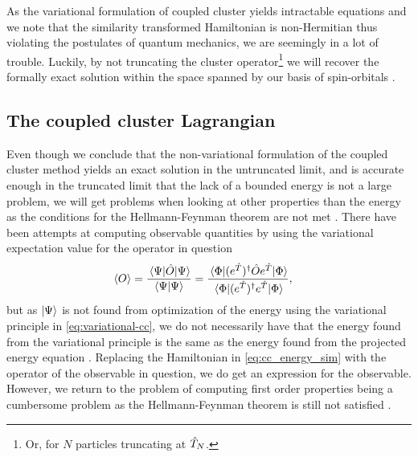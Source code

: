             As the variational formulation of coupled cluster yields intractable
            equations and we note that the similarity transformed Hamiltonian is
            non-Hermitian thus violating the postulates of quantum mechanics, we
            are seemingly in a lot of trouble.
            Luckily, by not truncating the cluster operator\footnote{%
                Or, for $N$ particles truncating at $\hat{T}_N$.
            } we will recover the formally exact solution within the space
            spanned by our basis of spin-orbitals \cite{coester1958421,
            monkhorst1977421}.

        \subsection{The coupled cluster Lagrangian}
            Even though we conclude that the non-variational formulation of
            the coupled cluster method yields an exact solution in the
            untruncated limit, and is accurate enough in the truncated limit
            that the lack of a bounded energy is not a large problem,
            we will get problems when looking at other properties than the
            energy as the conditions for the Hellmann-Feynman theorem are not
            met \cite{helgaker-molecular}.
            There have been attempts at computing observable quantities by using
            the variational expectation value for the operator in question
            \cite{exp-value-cizek, fink1974163}
            \begin{align}
                \expval{O}
                &= \frac{\mel{\Psi}{\hat{O}}{\Psi}}{\braket{\Psi}{\Psi}}
                = \frac{
                    \mel{\Phi}{
                        (e^{\hat{T}})^{\dagger}
                        \hat{O}
                        e^{\hat{T}}
                    }{\Phi}
                }{
                    \mel{\Phi}{
                        (e^{\hat{T}})^{\dagger}
                        e^{\hat{T}}
                    }{\Phi}
                },
            \end{align}
            but as $\ket{\Psi}$ is not found from optimization of the energy
            using the variational principle in \autoref{eq:variational-cc}, we
            do not necessarily have that the energy found from the variational
            principle is the same as the energy found from the projected energy
            equation \cite{kvaal2013variational}.
            Replacing the Hamiltonian in \autoref{eq:cc_energy_sim} with the
            operator of the observable in question, we do get an expression for
            the observable.
            However, we return to the problem of computing first order
            properties being a cumbersome problem as the Hellmann-Feynman
            theorem is still not satisfied \cite{helgaker-molecular,
            kvaal2013variational}.


